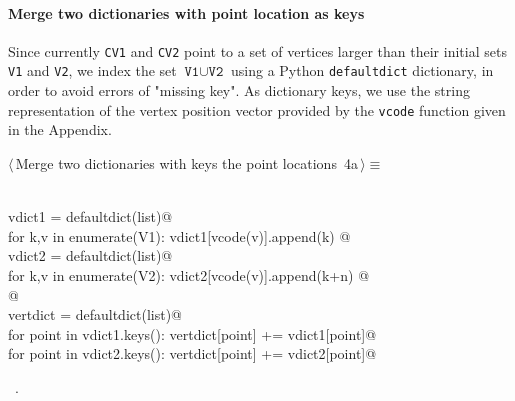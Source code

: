 \documentclass[11pt,oneside]{article}	%
\begin{document}
\paragraph{Merge two dictionaries with point location as keys}
Since currently \texttt{CV1} and \texttt{CV2} point to a set of vertices larger than their initial sets 
\texttt{V1} and \texttt{V2}, we index the set $\texttt{V1} \cup \texttt{V2}$ using a Python \texttt{defaultdict} dictionary, in order to avoid errors of "missing key". As dictionary keys, we use the string representation of the vertex position vector provided by the \texttt{vcode} function given in the Appendix.
\begin{flushleft} \small \label{scrap5}
\protect{}$\langle\,$Merge two dictionaries with keys the point locations\nobreak\ {\footnotesize 4a}$\,\rangle\equiv$
\vspace{-1ex}
\begin{list}{}{} \item
\mbox{}\verb@@\\
\mbox{}\verb@   vdict1 = defaultdict(list)@\\
\mbox{}\verb@   for k,v in enumerate(V1): vdict1[vcode(v)].append(k) @\\
\mbox{}\verb@   vdict2 = defaultdict(list)@\\
\mbox{}\verb@   for k,v in enumerate(V2): vdict2[vcode(v)].append(k+n) @\\
\mbox{}\verb@   @\\
\mbox{}\verb@   vertdict = defaultdict(list)@\\
\mbox{}\verb@   for point in vdict1.keys(): vertdict[point] += vdict1[point]@\\
\mbox{}\verb@   for point in vdict2.keys(): vertdict[point] += vdict2[point]@\\
\mbox{}\verb@@{\NWsep}
\end{list}
\vspace{-1ex}
\footnotesize\addtolength{\baselineskip}{-1ex}
\begin{list}{}{\setlength{\itemsep}{-\parsep}\setlength{\itemindent}{-\leftmargin}}
\item \NWtxtMacroRefIn\ .
\end{list}
\end{flushleft}
\end{document}
